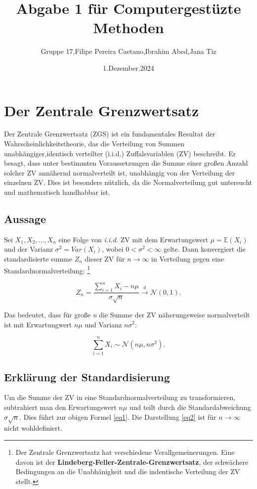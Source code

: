 \documentclass{article}
\title{Abgabe 1 für Computergestüzte Methoden}
\author{Gruppe 17,Filipe Pereira Caetano,Ibrahim Abed,Jana Tiz}
\date{1.Dezember.2024}
\begin{document}
\maketitle
\tableofcontents
\newpage
\section{Der Zentrale Grenzwertsatz}

Der Zentrale Grenzwertsatz (ZGS) ist ein fundamentales Resultat der Wahrscheinlichkeitstheorie, das die Verteilung von Summen unabhängiger,identisch verteilter (i.i.d.) Zuffalsvariablen (ZV) beschreibt. Er besagt, dass unter bestimmten Voraussetzungen die Summe einer großen Anzahl solcher ZV annähernd normalverteilt ist, unabhängig von der Verteilung der einzelnen ZV. Dies ist besonders nützlich, da die Normalverteilung gut untersucht und mathematisch handhabbar ist.

\subsection{Aussage}
Sei $X_1,X_2,...,X_n$ eine Folge von \emph{i.i.d.} ZV mit dem Erwartungswert $\mu =\mathbb{E}(X_i)$ und der Varianz $\sigma^2=Var(X_i)$, wobei $0 < \sigma^2 < \infty$ gelte. Dann konvergiert die standardisierte summe $Z_n$ dieser ZV für $n \to \infty$ in Verteilung gegen eine Standardnormalverteilung: \footnote{Der Zentrale Grenzwertsatz hat verschiedene Verallgemeinerungen. Eine davon ist der \textbf{Lindeberg-Feller-Zentrale-Grenzwertsatz}\cite[Seite 328]{klenke}, der schwächere Bedingungen an die Unabhänigkeit und die indentische Verteilung der ZV stellt.}



\begin{equation}\label{eq1}
    Z_n = \frac{\sum_{i=1}^n X_i-n\mu}{\sigma\sqrt{n}} \xrightarrow{d} \mathcal{N}(0,1).
\end{equation}

Das bedeutet, dass für große \emph{n} die Summe der ZV näherungsweise normalverteilt ist mit Erwartungwert $n\mu$ und Varianz $n\sigma^2$:

\begin{equation}\label{eq2}
    \sum_{i=1}^n X_i\sim \mathcal{N} (n\mu,n\sigma^2).
\end{equation}




\subsection{Erklärung der Standardisierung}
Um die Summe der ZV in eine Standardnormalverteilung zu transformieren, subtrahiert man den Erwartungswert $n\mu$ und teilt durch die Standardabweichung $\sigma\sqrt{n}$. Dies führt zur obigen Formel \eqref{eq1}. Die Darstellung \eqref{eq2} ist für $n \to \infty$ nicht wohldefiniert.
\end{document}

